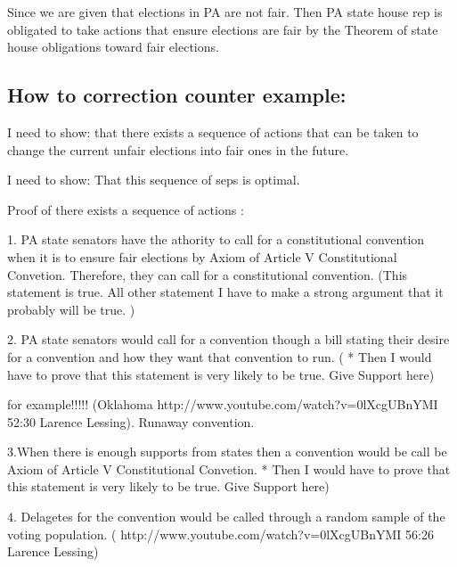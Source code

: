 \documentclass[11pt]{article} %
\begin{document}
\begin{enumerate}
Since we are given that elections in PA are not fair.  Then  PA state house rep is obligated to take actions that ensure elections are fair by the Theorem of state house obligations toward fair elections.


\subsection{How to correction counter example:}


I need to show: that there exists a sequence of actions that can be taken to change the current unfair elections into fair ones in the future.  

I need to show: That this sequence of seps is optimal. 

Proof of there exists a sequence of actions : 


1. PA state senators have the athority to call for a constitutional convention when it is to ensure fair elections by Axiom of Article V Constitutional Convetion.  Therefore, they can call for a constitutional convention. (This statement is true.  All other statement I have to make a strong argument that it probably will be true. )

	
2. PA state senators would call for a convention though a bill stating their desire for a convention and how they want that convention to run.  ( * Then I would have to prove that this statement is very likely to be true.  Give Support here)

	for example!!!!! (Oklahoma http://www.youtube.com/watch?v=0lXcgUBnYMI  52:30   Larence Lessing).
	Runaway convention.

3.When there is enough supports from states then a convention would be call be Axiom of Article V Constitutional Convetion.   * Then I would have to prove that this statement is very likely to be true.  Give Support here)


4.   Delagetes for the convention would be called through a random sample of the voting population. ( http://www.youtube.com/watch?v=0lXcgUBnYMI  56:26   Larence Lessing)


\end{enumerate}
\end{document}
